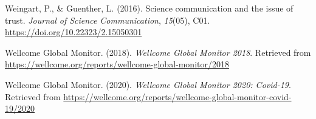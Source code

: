 \documentclass[
  doc,floatsintext]{apa6}
\newlength{\cslhangindent}
\newenvironment{CSLReferences}[2] %
 {\begin{list}{}{%
  \setlength{\itemindent}{0pt}
  \setlength{\leftmargin}{0pt}
  \setlength{\parsep}{0pt}
  \ifodd #1
   \setlength{\leftmargin}{\cslhangindent}
   \setlength{\itemindent}{-1\cslhangindent}
  \fi
  \setlength{\itemsep}{#2\baselineskip}}}
 {\end{list}}
\begin{document}
\begin{CSLReferences}{1}{0}
Weingart, P., \& Guenther, L. (2016). Science communication and the issue of trust. \emph{Journal of Science Communication}, \emph{15}(05), C01. \url{https://doi.org/10.22323/2.15050301}

Wellcome Global Monitor. (2018). \emph{Wellcome Global Monitor 2018}. Retrieved from \url{https://wellcome.org/reports/wellcome-global-monitor/2018}

Wellcome Global Monitor. (2020). \emph{Wellcome Global Monitor 2020: Covid-19}. Retrieved from \url{https://wellcome.org/reports/wellcome-global-monitor-covid-19/2020}

\end{CSLReferences}

\newpage

\appendix
\end{document}
